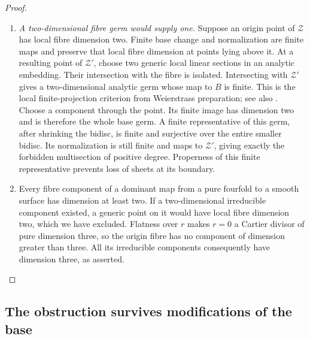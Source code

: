 \begin{proof}
\begin{enumerate}[label=\arabic*.,leftmargin=*]
\item \emph{A two-dimensional fibre germ would supply one.}
Suppose an origin point of $\mathcal Z$ has local
fibre dimension two. Finite base change and
normalization are finite maps and preserve that
local fibre dimension at points lying above it.
At a resulting point of $\mathcal Z'$, choose
two generic local linear sections in an analytic
embedding. Their intersection with the fibre is
isolated. Intersecting with $\mathcal Z'$ gives
a two-dimensional analytic germ whose map to
$B$ is finite. This is the local finite-projection
criterion from Weierstrass preparation; see also
\citet[Chapter II, Sections 7--8]{Demailly2012E}.
Choose a component through the point. Its finite
image has dimension two and is therefore the
whole base germ. A finite representative of this
germ, after shrinking the bidisc, is finite and
surjective over the entire smaller bidisc. Its
normalization is still finite and maps to
$\mathcal Z'$, giving exactly the forbidden
multisection of positive degree. Properness of
this finite representative prevents loss of
sheets at its boundary.

\item Every fibre component of a dominant map from a
pure fourfold to a smooth surface has dimension
at least two. If a two-dimensional irreducible
component existed, a generic point on it would
have local fibre dimension two, which we have
excluded. Flatness over $r$ makes $r=0$ a
Cartier divisor of pure dimension three, so
the origin fibre has no component of dimension
greater than three. All its irreducible
components consequently have dimension three,
as asserted.
\end{enumerate}
\end{proof}

\subsection{The obstruction survives modifications of the base}

